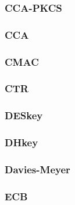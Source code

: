 \begin{frame}\frametitle{CCA-PKCS}
\begin{figure}
\begin{center}

\end{center}
\end{figure}
\end{frame}
\begin{frame}\frametitle{CCA}
\begin{figure}
\begin{center}

\end{center}
\end{figure}
\end{frame}
\begin{frame}\frametitle{CMAC}
\begin{figure}
\begin{center}

\end{center}
\end{figure}
\end{frame}
\begin{frame}\frametitle{CTR}
\begin{figure}
\begin{center}

\end{center}
\end{figure}
\end{frame}
\begin{frame}\frametitle{DESkey}
\begin{figure}
\begin{center}

\end{center}
\end{figure}
\end{frame}
\begin{frame}\frametitle{DHkey}
\begin{figure}
\begin{center}

\end{center}
\end{figure}
\end{frame}
\begin{frame}\frametitle{Davies-Meyer}
\begin{figure}
\begin{center}

\end{center}
\end{figure}
\end{frame}
\begin{frame}\frametitle{ECB}
\begin{figure}
\begin{center}

\end{center}
\end{figure}
\end{frame}
